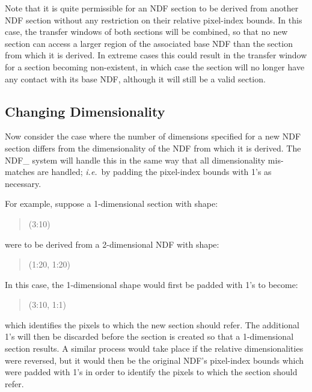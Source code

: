 \documentclass[twoside,11pt]{article}
\newcommand{\xlabel}[1]{}
\newcommand{\st}[1]{{\em{#1}}}
\begin{document}
Note that it is quite permissible for an NDF section to be derived from
another NDF section without any restriction on their relative pixel-index
bounds. 
In this case, the transfer windows of both sections will be combined, so
that no new section can access a larger region of the associated base NDF
than the section from which it is derived. 
In extreme cases this could result in the transfer window for a section
becoming non-existent, in which case the section will no longer have any
contact with its base NDF, although it will still be a valid section. 

\subsection{\xlabel{changing_dimensionality}\label{ss:changingdimensionality}Changing Dimensionality}

Now consider the case where the number of dimensions specified for a new NDF
section differs from the dimensionality of the NDF from which it is derived.
The NDF\_ system will handle this in the same way that all dimensionality
mis-matches are handled; \st{i.e.}\ by padding the pixel-index bounds with
1's as necessary. 

For example, suppose a 1-dimensional section with shape:

\small
\begin{quote}
\begin{center}
(3:10)
\end{center}
\end{quote}
\normalsize

were to be derived from a 2-dimensional NDF with shape:

\small
\begin{quote}
\begin{center}
(1:20, 1:20)
\end{center}
\end{quote}
\normalsize

In this case, the 1-dimensional shape would first be padded with 1's to 
become:

\small
\begin{quote}
\begin{center}
(3:10, 1:1)
\end{center}
\end{quote}
\normalsize

which identifies the pixels to which the new section should refer.
The additional 1's will then be discarded before the section is created so
that a 1-dimensional section results. 
A similar process would take place if the relative dimensionalities were
reversed, but it would then be the original NDF's pixel-index bounds which
were padded with 1's in order to identify the pixels to which the section
should refer. 
\end{document}
